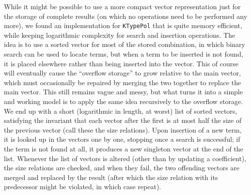 \documentclass[12pt]{article}
\theoremstyle{plain}
\theoremstyle{definition}
\begin{document}
While it might be possible to use a more compact vector representation just for
the storage of complete results (on which no operations need to be performed any
more), we found an implementation for \texttt{KTypePol} that is quite memory
efficient, while keeping logarithmic complexity for search and insertion
operations. The idea is to use a sorted vector for most of the stored
combination, in which binary search can be used to locate terms, but when a term
to be inserted is not found, it is placed elsewhere rather than being inserted
into the vector. This of course will eventually cause the ``overflow storage''
to grow relative to the main vector, which must occasionally be repaired by
merging the two together to replace the main vector. This still remains vague
and messy, but what turns it into a simple and working model is to apply the
same idea recursively to the overflow storage. We end up with a short
(logarithmic in length, at worst) list of sorted vectors, satisfying the
invariant that each vector after the first is at most half the size of the
previous vector (call these the size relations). Upon insertion of a new term,
it is looked up in the vectors one by one, stopping once a search is successful;
if the term is not found at all, it produces a new singleton vector at the end
of the list. Whenever the list of vectors is altered (other than by updating a
coefficient), the size relations are checked, and when they fail, the two
offending vectors are merged and replaced by the result (after which the size
relation with its predecessor might be violated, in which case repeat).
\end{document}
